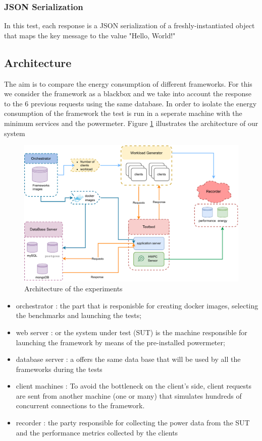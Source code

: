 \subsubsection{JSON Serialization}
In this test, each response is a JSON serialization of a freshly-instantiated object that maps the key message to the value "Hello, World!"



\subsection{Architecture}
The aim is to compare the energy consumption of different frameworks. For this we consider the framework as a blackbox and we take into account the response to the 6 previous requests using the same database.
In order to isolate the energy consumption of the framework the test is run in a seperate machine with the minimum services and the powermeter.
Figure \ref{fig:architecture} illustrates the architecture of our system

\begin{figure}\centering
    \includegraphics[width=.8\columnwidth]{imgs/architecture}
    \caption[Architecture]{Architecture of the experiments}
    \label{fig:architecture}
\end{figure}

\begin{itemize}
    \item orchestrator : the part that is responisble for creating docker images, selecting the benchmarks and launching the tests;
    \item web server : or the system under test (SUT) is the machine  responsible for launching the framework  by means of the pre-installed powermeter;
    \item database server : a offers the same data base that will be used by all the frameworks during the tests
    \item client machines : To avoid the bottleneck on the client's side, client requests are sent from another machine (one or many) that simulates hundreds of concurrent connections to the framework.
    \item recorder : the party responsible for collecting the power data from the SUT and the performance metrics collected by the clients 
\end{itemize}

